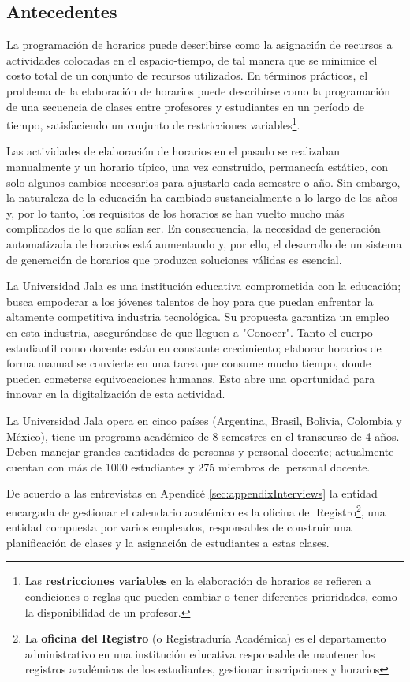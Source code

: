 \subsection{Antecedentes}
La programación de horarios puede describirse como la asignación de recursos a actividades colocadas en el espacio-tiempo, de tal manera que se minimice el costo total de un conjunto de recursos utilizados.
En términos prácticos, el problema de la elaboración de horarios puede describirse como la programación de una secuencia de clases entre profesores y estudiantes en un período de tiempo, satisfaciendo un conjunto de restricciones variables\footnote{Las \textbf{restricciones variables} en la elaboración de horarios se refieren a condiciones o reglas que pueden cambiar o tener diferentes prioridades, como la disponibilidad de un profesor.}.

Las actividades de elaboración de horarios en el pasado se realizaban manualmente y un horario típico, una vez construido, permanecía estático, con solo algunos cambios necesarios para ajustarlo cada semestre o año.
Sin embargo, la naturaleza de la educación ha cambiado sustancialmente a lo largo de los años y, por lo tanto, los requisitos de los horarios se han vuelto mucho más complicados de lo que solían ser. 
En consecuencia, la necesidad de generación automatizada de horarios está aumentando y, por ello, el desarrollo de un sistema de generación de horarios que produzca soluciones válidas es esencial.

La Universidad Jala es una institución educativa comprometida con la educación; busca empoderar a los jóvenes talentos de hoy para que puedan enfrentar la altamente competitiva industria tecnológica. 
Su propuesta garantiza un empleo en esta industria, asegurándose de que lleguen a "Conocer".
Tanto el cuerpo estudiantil como docente están en constante crecimiento; elaborar horarios de forma manual se convierte en una tarea que consume mucho tiempo, donde pueden cometerse equivocaciones humanas.
Esto abre una oportunidad para innovar en la digitalización de esta actividad.

La Universidad Jala opera en cinco países (Argentina, Brasil, Bolivia, Colombia y México), tiene un programa académico de 8 semestres en el transcurso de 4 años.
Deben manejar grandes cantidades de personas y personal docente; actualmente cuentan con más de 1000 estudiantes y 275 miembros del personal docente.

De acuerdo a las entrevistas en Apendicé \ref{sec:appendixInterviews} la entidad encargada de gestionar el calendario académico es la oficina del Registro\footnote{La \textbf{oficina del Registro} (o Registraduría Académica) es el departamento administrativo en una institución educativa responsable de mantener los registros académicos de los estudiantes, gestionar inscripciones y horarios}, una entidad compuesta por varios empleados, responsables de construir una planificación de clases y la asignación de estudiantes a estas clases.

